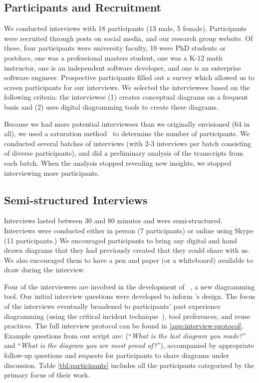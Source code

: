 \subsection{Participants and Recruitment} 
We conducted interviews with 18 participants (13 male, 5 female). Participants were recruited through posts on social media, and our research group website. Of these, four participants were university faculty, 10 were PhD students or postdocs, one was a professional masters student, one was a K-12 math instructor, one is an independent software developer, and one is an enterprise software engineer. Prospective participants filled out a survey which allowed us to screen participants for our interviews. We selected the interviewees based on the following criteria: the interviewee (1) creates conceptual diagrams on a frequent basis and (2) uses digital diagramming tools to create these diagrams. 

Because we had more potential interviewees than we originally envisioned (64 in all), we used a saturation method~\cite{socialResearchMethods} to determine the number of participants. We conducted several batches of interviews (with 2-3 interviews per batch consisting of diverse participants), and did a preliminary analysis of the transcripts from each batch. When the analysis stopped revealing new insights, we stopped interviewing more participants. 

\subsection{Semi-structured Interviews}
 
Interviews lasted between 30 and 80 minutes and were semi-structured. Interviews were conducted either in person (7 participants) or online using Skype (11 participants.) We encouraged participants to bring any digital and hand drawn diagrams that they had previously created that they could share with us. We also encouraged them to have a pen and paper (or a whiteboard) available to draw during the interview. 

Four of the interviewers are involved in the development of \Penrose{}~\cite{DSLDI, OBT}, a new diagramming tool. Our initial interview questions were developed to inform \Penrose{}'s design. The focus of the interviews eventually broadened to participants' past experience diagramming (using the critical incident technique~\cite{criticalIncident}), tool preferences, and reuse practices. The full interview protocol can be found in \cref{app:interview-protocol}. Example questions from our script are: (``\textit{What is the last diagram you made?}'' and ``\textit{What is the diagram you are most proud of?}''), accompanied by appropriate follow-up questions and requests for participants to share diagrams under discussion. Table \ref{tbl:participants} includes all the participants categorized by the primary focus of their work.

